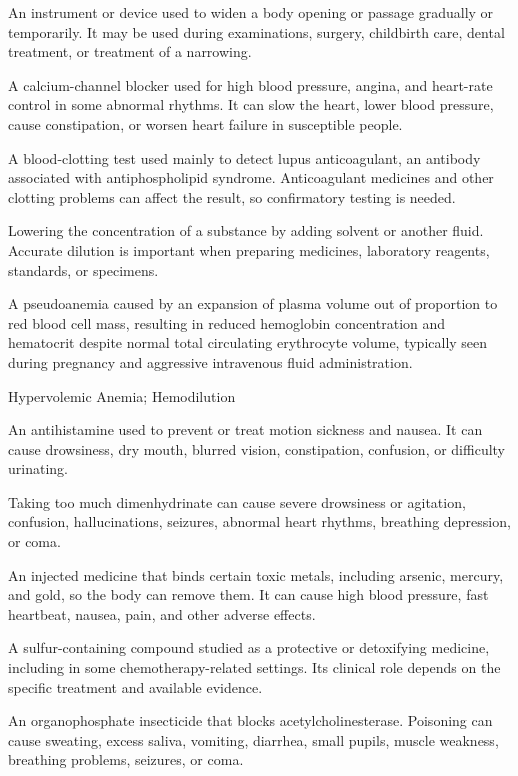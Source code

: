  An instrument or device used to widen a body opening or passage gradually or temporarily. It may be used during examinations, surgery, childbirth care, dental treatment, or treatment of a narrowing.

 A calcium-channel blocker used for high blood pressure, angina, and heart-rate control in some abnormal rhythms. It can slow the heart, lower blood pressure, cause constipation, or worsen heart failure in susceptible people.

 A blood-clotting test used mainly to detect lupus anticoagulant, an antibody associated with antiphospholipid syndrome. Anticoagulant medicines and other clotting problems can affect the result, so confirmatory testing is needed.

 Lowering the concentration of a substance by adding solvent or another fluid. Accurate dilution is important when preparing medicines, laboratory reagents, standards, or specimens.

 A pseudoanemia caused by an expansion of plasma volume out of proportion to red blood cell mass, resulting in reduced hemoglobin concentration and hematocrit despite normal total circulating erythrocyte volume, typically seen during pregnancy and aggressive intravenous fluid administration.

\synonyms
Hypervolemic Anemia; Hemodilution

 An antihistamine used to prevent or treat motion sickness and nausea. It can cause drowsiness, dry mouth, blurred vision, constipation, confusion, or difficulty urinating.

 Taking too much dimenhydrinate can cause severe drowsiness or agitation, confusion, hallucinations, seizures, abnormal heart rhythms, breathing depression, or coma.

 An injected medicine that binds certain toxic metals, including arsenic, mercury, and gold, so the body can remove them. It can cause high blood pressure, fast heartbeat, nausea, pain, and other adverse effects.

 A sulfur-containing compound studied as a protective or detoxifying medicine, including in some chemotherapy-related settings. Its clinical role depends on the specific treatment and available evidence.

 An organophosphate insecticide that blocks acetylcholinesterase. Poisoning can cause sweating, excess saliva, vomiting, diarrhea, small pupils, muscle weakness, breathing problems, seizures, or coma.

